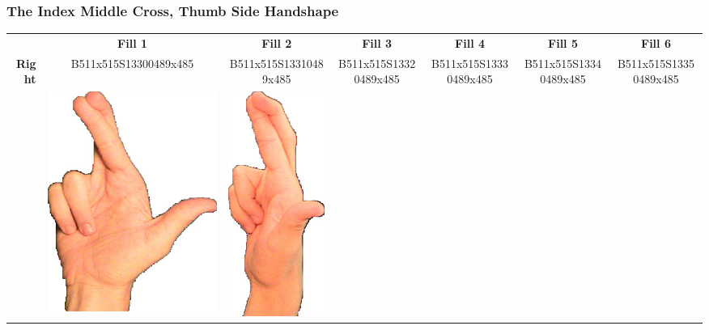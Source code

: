 \documentclass{article}
\begin{document}
\subsubsection{The Index Middle Cross, Thumb Side Handshape}

\begin{center}
\begin{tabular}{r*{6}{c}}
&\textbf{Fill 1}&\textbf{Fill 2}&\textbf{Fill 3}&\textbf{Fill 4}&\textbf{Fill 5}&\textbf{Fill 6}\\
\multirow{2}{*}{\textbf{Right}}&
B511x515S13300489x485&
B511x515S13310489x485&
B511x515S13320489x485&
B511x515S13330489x485&
B511x515S13340489x485&
B511x515S13350489x485\\
&
\includegraphics[scale=0.1]{images/03-09-1.jpg}&
\includegraphics[scale=0.1]{images/03-09-2.jpg}&

\end{tabular}
\end{center}
\end{document}
